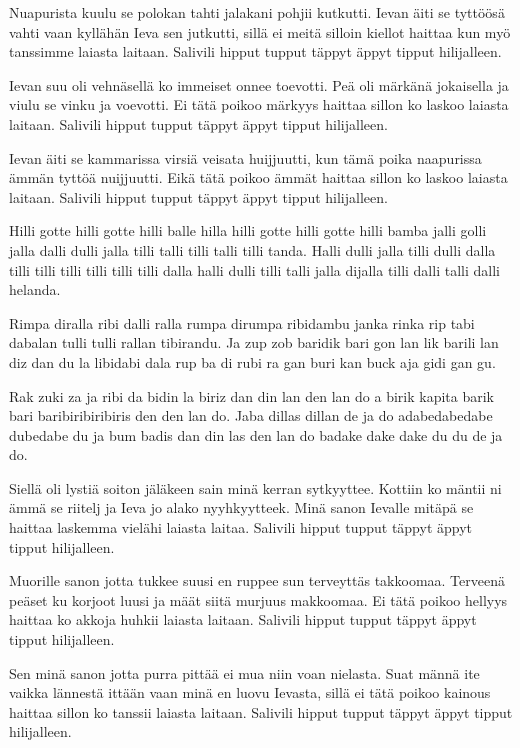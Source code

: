 \beginverse
Nuapurista kuulu se polokan tahti jalakani pohjii kutkutti.
Ievan äiti se tyttöösä vahti vaan kyllähän Ieva sen jutkutti,
sillä ei meitä silloin kiellot haittaa kun myö tanssimme laiasta laitaan.
Salivili hipput tupput täppyt äppyt tipput hilijalleen.
\endverse

\beginverse
Ievan suu oli vehnäsellä ko immeiset onnee toevotti.
Peä oli märkänä jokaisella ja viulu se vinku ja voevotti.
Ei tätä poikoo märkyys haittaa sillon ko laskoo laiasta laitaan.
Salivili hipput tupput täppyt äppyt tipput hilijalleen.
\endverse

\beginverse
Ievan äiti se kammarissa virsiä veisata huijjuutti,
kun tämä poika naapurissa ämmän tyttöä nuijjuutti.
Eikä tätä poikoo ämmät haittaa sillon ko laskoo laiasta laitaan.
Salivili hipput tupput täppyt äppyt tipput hilijalleen.
\endverse

\beginverse
Hilli gotte hilli gotte hilli balle hilla hilli gotte hilli gotte hilli bamba
jalli golli jalla dalli dulli jalla tilli talli tilli talli tilli tanda.
Halli dulli jalla tilli dulli dalla tilli tilli tilli tilli tilli tilli dalla
halli dulli tilli talli jalla dijalla tilli dalli talli dalli helanda.
\endverse

\beginverse
Rimpa diralla ribi dalli ralla rumpa dirumpa ribidambu
janka rinka rip tabi dabalan tulli tulli rallan tibirandu.
Ja zup zob baridik bari gon lan lik barili lan diz dan du
la libidabi dala rup ba di rubi ra gan buri kan buck aja gidi gan gu.
\endverse

\beginverse
Rak zuki za ja ribi da bidin la biriz dan din lan den lan do
a birik kapita barik bari baribiribiribiris den den lan do.
Jaba dillas dillan de ja do adabedabedabe dubedabe du ja bum
badis dan din las den lan do badake dake dake du du de ja do.
\endverse

\beginverse
Siellä oli lystiä soiton jäläkeen sain minä kerran sytkyyttee.
Kottiin ko mäntii ni ämmä se riitelj ja Ieva jo alako nyyhkyytteek.
Minä sanon Ievalle mitäpä se haittaa laskemma vielähi laiasta laitaa.
Salivili hipput tupput täppyt äppyt tipput hilijalleen.
\endverse

\beginverse
Muorille sanon jotta tukkee suusi en ruppee sun terveyttäs takkoomaa.
Terveenä peäset ku korjoot luusi ja määt siitä murjuus makkoomaa.
Ei tätä poikoo hellyys haittaa ko akkoja huhkii laiasta laitaan.
Salivili hipput tupput täppyt äppyt tipput hilijalleen.
\endverse

\beginverse
Sen minä sanon jotta purra pittää ei mua niin voan nielasta.
Suat männä ite vaikka lännestä ittään vaan minä en luovu Ievasta,
sillä ei tätä poikoo kainous haittaa sillon ko tanssii laiasta laitaan.
Salivili hipput tupput täppyt äppyt tipput hilijalleen.
\endverse

\endsong